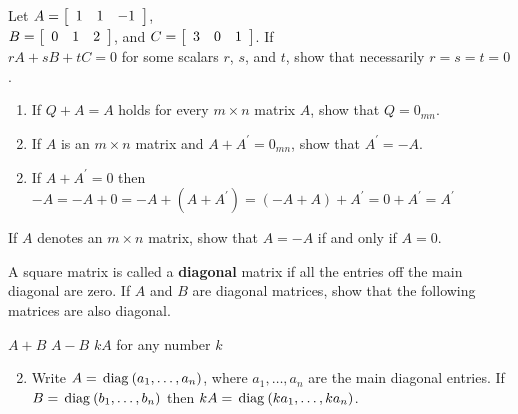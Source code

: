 \begin{multicols}{2}
\begin{ex}
\begin{sol}
\begin{enumerate}[label={\alph*.}]
\end{enumerate}
\end{sol}
\end{ex}

\begin{ex}
Let $A = \left[ \begin{array}{rrr}
1 & 1 & -1
\end{array} \right]$, \\ $B = \left[ \begin{array}{rrr}
0 & 1 & 2
\end{array} \right]$, and 
$C = \left[ \begin{array}{rrr}
3 & 0 & 1
\end{array} \right]$. If \\ $rA + sB + tC = 0$ for some scalars $r$, $s$, and $t$, show that necessarily $r = s = t = 0$.
\end{ex}

\begin{ex}
\begin{enumerate}[label={\alph*.}]
\item If $Q + A = A$ holds for every $m \times n$ matrix $A$, show that $Q = 0_{mn}$.

\item If $A$ is an $m \times n$ matrix and $A + A^\prime = 0_{mn}$, show that $A^\prime = -A$.

\end{enumerate}
\begin{sol}
\begin{enumerate}[label={\alph*.}]
\setcounter{enumi}{1}
\item  If $A + A^\prime = 0$ then $-A = -A + 0 = -A + (A + A^\prime) = (-A + A) + A^\prime = 0 + A^\prime = A^\prime$

\end{enumerate}
\end{sol}
\end{ex}

\begin{ex}
If $A$ denotes an $m \times n$ matrix, show that $A = -A$ if and only if $A = 0$.
\end{ex}

\begin{ex}
A square matrix is called a \textbf{diagonal} matrix if all the entries off the main diagonal are zero. If $A$ and $B$ are diagonal matrices, show that the following matrices are also diagonal.
\begin{exenumerate}
\exitem $A + B$
\exitem $A - B$
\exitem $kA$ for any number $k$
\end{exenumerate}
\begin{sol}
\begin{enumerate}[label={\alph*.}]
\setcounter{enumi}{1}
\item  Write $A = \thinspace\operatorname{diag\medspace}(a_{1}, \dots, a_{n})$, where $a_{1}, \dots, a_{n}$ are the main diagonal entries. If $B = \thinspace\operatorname{diag\medspace}(b_{1}, \dots, b_{n})$ then $kA = \thinspace\operatorname{diag\medspace}(ka_{1}, \dots, ka_{n})$.


\end{enumerate}
\end{sol}
\end{ex}
\end{multicols}
